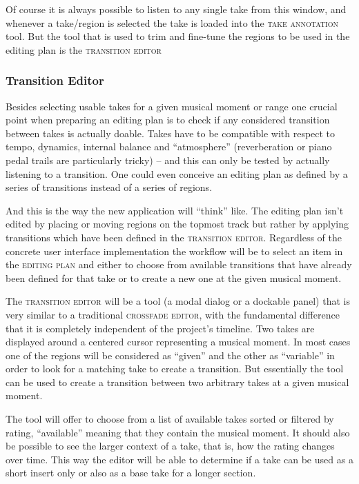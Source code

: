 \documentclass[11pt,a4paper]{article}
\newcommand*{\term}[1]{\textsc{#1}}
\begin{document}
Of course it is always possible to listen to any single take from this window,
and whenever a take/region is selected the take is loaded into the \term{take
annotation} tool.
But the tool that is used to trim and fine-tune the regions to be used in the
editing plan is the \term{transition editor}

\subsubsection{Transition Editor}

Besides selecting usable takes for a given musical moment or range 
one crucial point when preparing an editing plan is to check if any considered
transition between takes is actually doable.
Takes have to be compatible with respect to tempo, dynamics, internal balance
and “atmosphere” (reverberation or piano pedal trails are particularly tricky)
-- and this can only be tested by actually listening to a transition.
One could even conceive an editing plan as defined by a series of transitions
instead of a series of regions.

And this is the way the new application will “think” like.
The editing plan isn't edited by placing or moving regions on the topmost track but
rather by applying transitions which have been defined in the \term{transition
editor}. Regardless of the concrete user interface implementation the workflow
will be to select an item in the \term{editing plan} and either to choose from
available transitions that have already been defined for that take or to create a
new one at the given musical moment.

The \term{transition editor} will be a tool (a modal dialog or a dockable panel)
that is very similar to a traditional \term{crossfade editor}, with the fundamental
difference that it is completely independent of the project's timeline.
Two takes are displayed around a centered cursor representing a
musical moment. In most cases one of the regions will be considered as “given” and
the other as “variable” in order to look for a matching take to create a transition.
But essentially the tool can be used to create a transition between two arbitrary
takes at a given musical moment.

The tool will offer to choose from a list of available takes sorted or filtered
by rating, “available” meaning that they contain the musical moment.
It should also be possible to see the larger context of a take, that is, how the
rating changes over time. This way the editor will be able to determine if a take
can be used as a short insert only or also as a base take for a longer section.
\end{document}
